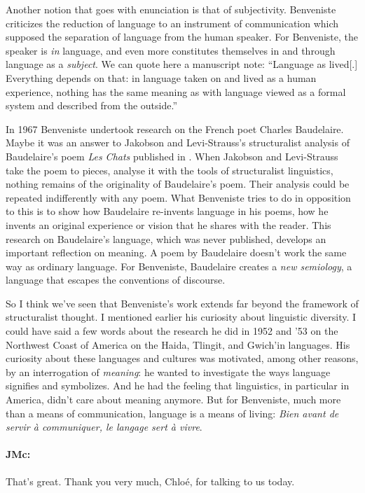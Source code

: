 \documentclass[output=paper]{langscibook}
\begin{document}
Another notion that goes with enunciation is that of subjectivity. Benveniste criticizes the reduction of language to an instrument of communication which supposed the separation of language from the human speaker. For Benveniste, the speaker is \textit{in} language, and even more constitutes themselves in and through language as a \textit{subject}. We can quote here a manuscript note: “Language as lived[.] Everything depends on that: in language taken on and lived as a human experience, nothing has the same meaning as with language viewed as a formal system and described from the outside.”

In 1967 Benveniste undertook research on the French poet Charles Baudelaire. Maybe it was an answer to Jakobson and Levi-Strauss’s structuralist analysis of Baudelaire’s poem \textit{Les Chats} published in \citeyear{jakobson1962b}. When Jakobson and Levi-Strauss take the poem to pieces, analyse it with the tools of structuralist linguistics, nothing remains of the originality of Baudelaire’s poem. Their analysis could be repeated indifferently with any poem. What Benveniste tries to do in opposition to this is to show how Baudelaire re-invents language in his poems, how he invents an original experience or vision that he shares with the reader. This research on Baudelaire’s language, which was never published, develops an important reflection on meaning. A poem by Baudelaire doesn’t work the same way as ordinary language. For Benveniste, Baudelaire creates a \textit{new semiology}, a language that escapes the conventions of discourse.

So I think we’ve seen that Benveniste’s work extends far beyond the framework of structuralist thought. I mentioned earlier his curiosity about linguistic diversity. I could have said a few words about the research he did in 1952 and ’53 on the Northwest Coast of America on the Haida, Tlingit, and Gwich’in languages. His curiosity about these languages and cultures was motivated, among other reasons, by an interrogation of \textit{meaning}: he wanted to investigate the ways language signifies and symbolizes. And he had the feeling that linguistics, in particular in America, didn’t care about meaning anymore. But for Benveniste, much more than a means of communication, language is a means of living: \textit{Bien avant de servir à communiquer, le langage sert à vivre}.

\paragraph*{JMc:} That’s great. Thank you very much, Chloé, for talking to us today.
\end{document}
